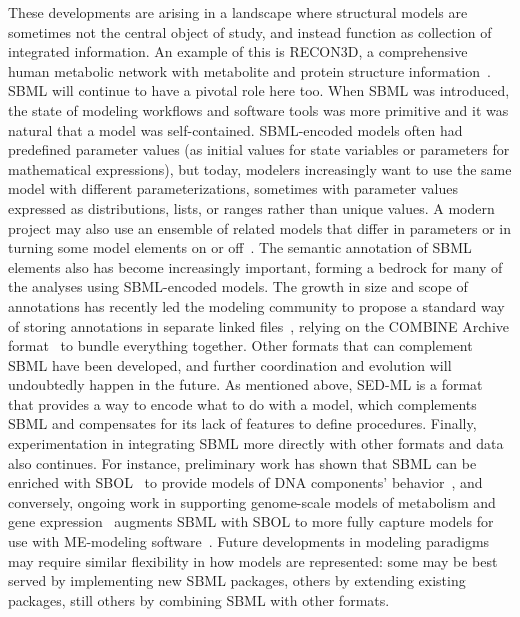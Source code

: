 \documentclass{sbml-paper}
\begin{document}
These developments are arising in a landscape where structural models are sometimes not the central object of study, and instead function as collection of integrated information.  An example of this is RECON3D, a comprehensive human metabolic network with metabolite and protein structure information~\citep{brunk2018}.  SBML will continue to have a pivotal role here too.  When SBML was introduced, the state of modeling workflows and software tools was more primitive and it was natural that a model was self-contained.  SBML-encoded models often had predefined parameter values (\eg as initial values for state variables or parameters for mathematical expressions), but today, modelers increasingly want to use the same model with different parameterizations, sometimes with parameter values expressed as distributions, lists, or ranges rather than unique values.  A modern project may also use an ensemble of related models that differ in parameters or in turning some model elements on or off~\citep{kuepfer2007ensemble}.  The semantic annotation of SBML elements also has become increasingly important, forming a bedrock for many of the analyses using SBML-encoded models.  The growth in size and scope of annotations has recently led the modeling community to propose a standard way of storing annotations in separate linked files~\citep{Neal2019harmonizing}, relying on the COMBINE Archive format~\citep{bergmann2014combine} to bundle everything together.  Other formats that can complement SBML have been developed, and further coordination and evolution will undoubtedly happen in the future.  As mentioned above, SED-ML is a format that provides a way to encode what to do with a model, which complements SBML and compensates for its lack of features to define procedures.  Finally, experimentation in integrating SBML more directly with other formats and data also continues.  For instance, preliminary work has shown that SBML can be enriched with SBOL~\citep{voigt2018sbmlme} to provide models of DNA components' behavior~\citep{Roehner2014a}, and conversely, ongoing work in supporting genome-scale models of metabolism and gene expression~\citep[known as \emph{ME-models}, ][]{Thiele2012multiscale} augments SBML with SBOL to more fully capture models for use with ME-modeling software~\citep{galdzicki_2014}.  Future developments in modeling paradigms may require similar flexibility in how models are represented: some may be best served by implementing new SBML packages, others by extending existing packages, still others by combining SBML with other formats.
\end{document}
